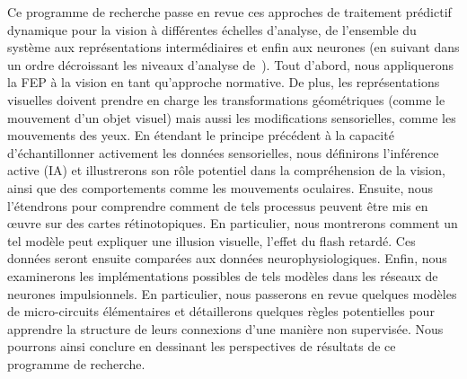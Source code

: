 Ce programme de recherche passe en revue ces approches de traitement prédictif
dynamique pour la vision à différentes échelles d'analyse, de l'ensemble
du système aux représentations intermédiaires et enfin aux neurones (en
suivant dans un ordre décroissant les niveaux d'analyse de~\citet{Marr83}).
Tout d'abord, nous appliquerons la FEP à la vision en tant qu'approche
normative. De plus, les représentations visuelles doivent prendre en
charge les transformations géométriques (comme le mouvement d'un objet
visuel) mais aussi les modifications sensorielles, comme les mouvements
des yeux. En étendant le principe précédent à la capacité
d'échantillonner activement les données sensorielles, nous définirons
l'inférence active (IA) et illustrerons son rôle potentiel dans la
compréhension de la vision, ainsi que des comportements comme les
mouvements oculaires. Ensuite, nous l'étendrons pour
comprendre comment de tels processus peuvent être mis en œuvre sur des
cartes rétinotopiques. En particulier, nous montrerons
comment un tel modèle peut expliquer une illusion visuelle, l'effet du flash retardé. %
Ces données seront ensuite comparées aux données
neurophysiologiques. Enfin, nous examinerons les implémentations
possibles de tels modèles dans les réseaux de neurones impulsionnels. En particulier, nous passerons en revue quelques modèles de
micro-circuits élémentaires et détaillerons quelques règles potentielles
pour apprendre la structure de leurs connexions d'une manière non
supervisée. Nous pourrons ainsi conclure en dessinant les perspectives de résultats de ce programme de recherche.
%
